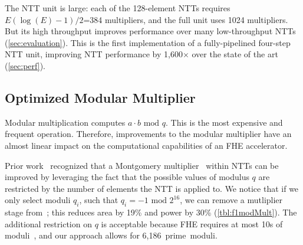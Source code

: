 The NTT unit is large: each of the 128-element NTTs requires $E(\log
(E)-1)/2$=384 multipliers, and the full unit uses 1024 multipliers. But its
high throughput improves performance over many low-throughput NTTs
(\autoref{sec:evaluation}). This is the first implementation of a
fully-pipelined four-step NTT unit, improving NTT performance by 1,600$\times$
over the state of the art (\autoref{sec:perf}).


\subsection{Optimized Modular Multiplier}\label{sec:modMult}
\tblFOneModMult

Modular multiplication computes $a\cdot b \textrm{ mod } q$. This is the most
expensive and frequent operation. Therefore, improvements to the modular
multiplier have an almost linear impact on the computational capabilities of an
FHE accelerator.

Prior work~\cite{mert:euromicro19:design} recognized that a Montgomery
multiplier~\cite{montgomery:mom85:modular} within NTTs can be improved by
leveraging the fact that the possible values of modulus $q$ are restricted by
the number of elements the NTT is applied to. We notice that if we only select
moduli $q_i$, such that $q_i = -1 \textrm{ mod } 2^{16}$, we can remove a
mutliplier stage from~\cite{mert:euromicro19:design}; this reduces area by 19\%
and power by 30\% (\autoref{tbl:f1modMult}). The additional restriction on $q$
is acceptable because FHE requires at most 10s of
moduli~\cite{gentry:crypto2012:homomorphic}, and our approach allows for
6,186~prime~moduli.

